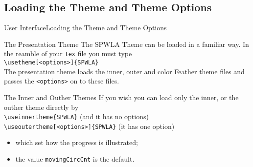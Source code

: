 \documentclass[10pt,xcolor={dvipsnames},aspectratio=169]{beamer}
\begin{document}
\subsection{Loading the Theme and Theme Options}
\begin{frame}{User Interface}{Loading the Theme and Theme Options}
  \vspace{-0.5em}
  \begin{block}{The Presentation Theme}
    \small
    The SPWLA Theme can be loaded in a familiar way. In the reamble of your {\tt tex} file you must type\\
    {\tt \textbackslash usetheme[<options>]\{SPWLA\}}\\
    The presentation theme loads the inner, outer and color Feather theme files and passes the {\tt <options>} on to these files.
  \end{block}
  \begin{block}{The Inner and Outher Themes}
    \small
    If you wish you can load only the inner, or the outher theme directly by\\
    {\tt \textbackslash useinnertheme\{SPWLA\}} (and it has no options)\\
    {\tt \textbackslash useoutertheme[<options>]\{SPWLA\}} (it has one option)\\
    \begin{itemize}
    \item which set how the progress is illustrated;
    \item the value {\tt movingCircCnt} is the default.
    \end{itemize}
  \end{block}
\end{frame}
\end{document}
